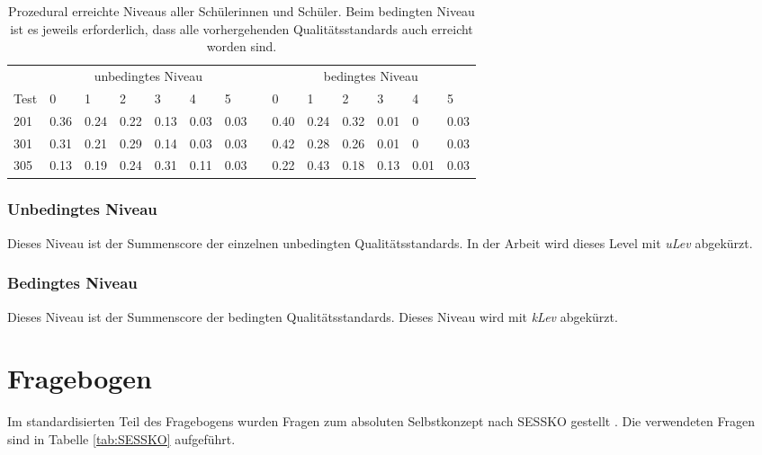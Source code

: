 \begin{table}[htbp]
  \centering
\begin{tabular}{@{}llllllllllllll@{}}
\toprule
 &  \multicolumn{6}{c}{unbedingtes Niveau} &&  \multicolumn{6}{c}{bedingtes Niveau}\\ 
 \cmidrule{2-7} \cmidrule{9-14}
 Test & 0 & 1 & 2 & 3 & 4 & 5 && 0 & 1 & 2 & 3 & 4 & 5\\ 
\midrule
 201 &   0.36 & 0.24 & 0.22 & 0.13 & 0.03 & 0.03 && 0.40 & 0.24 & 0.32  & 0.01 & 0 & 0.03   \\ 
 301 &   0.31 & 0.21 & 0.29 & 0.14 & 0.03 & 0.03  && 0.42 & 0.28 & 0.26 & 0.01 & 0 & 0.03  \\ 
 305 &   0.13 & 0.19 & 0.24 & 0.31 & 0.11 & 0.03  && 0.22 & 0.43 & 0.18 & 0.13 & 0.01 & 0.03 \\ 
\bottomrule
\end{tabular} 
  \caption{Prozedural erreichte Niveaus aller Schülerinnen und Schüler. Beim bedingten Niveau ist es jeweils erforderlich, dass alle vorhergehenden Qualitätsstandards auch erreicht worden sind.}
  \label{tab:Niveau}
\end{table}

\subsubsection{Unbedingtes Niveau}
Dieses Niveau ist der Summenscore der einzelnen unbedingten Qualitätsstandards. In der Arbeit wird dieses Level mit \textit{uLev} abgekürzt.

\subsubsection{Bedingtes Niveau}

Dieses Niveau ist der Summenscore der bedingten Qualitätsstandards. Dieses Niveau wird mit \textit{kLev} abgekürzt.




\section{Fragebogen}

Im standardisierten Teil des Fragebogens wurden Fragen zum absoluten Selbstkonzept nach SESSKO gestellt \citep{Schone2002}. Die verwendeten Fragen sind in Tabelle \ref{tab:SESSKO} aufgeführt. 



